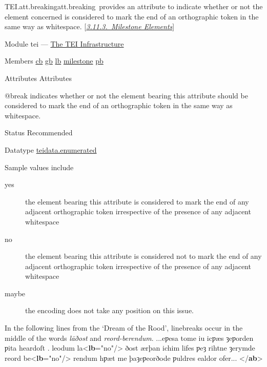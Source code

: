 \begin{reflist}
\item[]\begin{specHead}{TEI.att.breaking}{att.breaking} provides an attribute to indicate whether or not the element concerned is considered to mark the end of an orthographic token in the same way as whitespace. [\textit{\hyperref[CORS5]{3.11.3.\ Milestone Elements}}]\end{specHead} 
    \item[{Module}]
  tei — \hyperref[ST]{The TEI Infrastructure}
    \item[{Members}]
  \hyperref[TEI.cb]{cb} \hyperref[TEI.gb]{gb} \hyperref[TEI.lb]{lb} \hyperref[TEI.milestone]{milestone} \hyperref[TEI.pb]{pb}
    \item[{Attributes}]
  Attributes\hfil\\[-10pt]\begin{sansreflist}
    \item[@break]
  indicates whether or not the element bearing this attribute should be considered to mark the end of an orthographic token in the same way as whitespace.
\begin{reflist}
    \item[{Status}]
  Recommended
    \item[{Datatype}]
  \hyperref[TEI.teidata.enumerated]{teidata.enumerated}
    \item[{Sample values include}]
  \begin{description}

\item[{yes}]the element bearing this attribute is considered to mark the end of any adjacent orthographic token irrespective of the presence of any adjacent whitespace
\item[{no}]the element bearing this attribute is considered not to mark the end of any adjacent orthographic token irrespective of the presence of any adjacent whitespace
\item[{maybe}]the encoding does not take any position on this issue.
\end{description} 
    \item[]In the following lines from the ‘Dream of the Rood’, linebreaks occur in the middle of the words \textit{lāðost} and \textit{reord-berendum}. ...eƿesa tome iu icƿæs ȝeƿorden ƿita heardoſt .\mbox{}\newline 
 leodum la{<\textbf{lb}\hspace*{1em}{break}="{no}"/>} ðost ærþan ichim lifes\mbox{}\newline 
 ƿeȝ rihtne ȝerymde reord be{<\textbf{lb}\hspace*{1em}{break}="{no}"/>}\mbox{}\newline 
 rendum hƿæt me þaȝeƿeorðode ƿuldres ealdor ofer...\mbox{}\newline 
{</\textbf{ab}>}
\end{reflist}  
\end{sansreflist}  
\end{reflist}  
